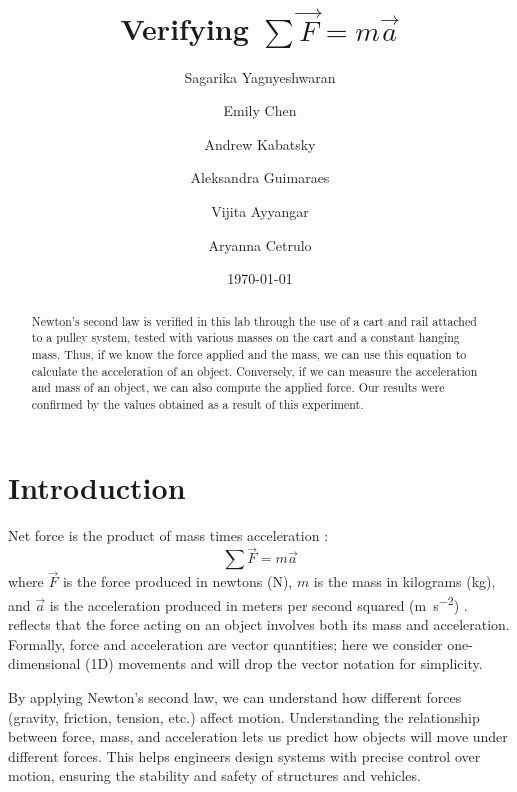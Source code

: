 \documentclass[reprint,amsmath,amssymb,aps]{revtex4-2}
\begin{document}
\title{Verifying $\sum\vec{F} = m\vec{a}$}

\author{Sagarika Yagnyeshwaran}
\author{Emily Chen}
\author{Andrew Kabatsky}
\author{Aleksandra Guimaraes}
\author{Vijita Ayyangar}
\author{Aryanna Cetrulo}
\date{\today}

\begin{abstract}
Newton’s second law is verified in this lab through the use of a cart and rail attached to a pulley system, tested with various masses on the cart and a constant hanging mass. Thus, if we know the force applied and the mass, we can use this equation to calculate the acceleration of an object. Conversely, if we can measure the acceleration and mass of an object, we can also compute the applied force. Our results were confirmed by the values obtained as a result of this experiment.
\end{abstract}


\maketitle





\section{Introduction}
Net force is the product of mass times acceleration \cite{newton1687principia}:
\begin{equation} 
\sum \vec{F} = m\vec{a}
\label{eq:1}
\end{equation}
where $\vec{F}$ is the force produced in newtons (\unit{\newton}), $m$ is the mass in kilograms (\unit{\kilo\gram}), and $\vec{a}$ is the acceleration produced in meters per second squared (\unit{\meter\per\second\squared}) \cite{newton1687principia}.  reflects that the force acting on an object involves both its mass and acceleration. Formally, force and acceleration are vector quantities; here we consider one-dimensional (1D) movements and will drop the vector notation for simplicity. 

By applying Newton's second law, we can understand how different forces (gravity, friction, tension, etc.) affect motion. Understanding the relationship between force, mass, and acceleration lets us predict how objects will move under different forces. This helps engineers design systems with precise control over motion, ensuring the stability and safety of structures and vehicles.
\end{document}
